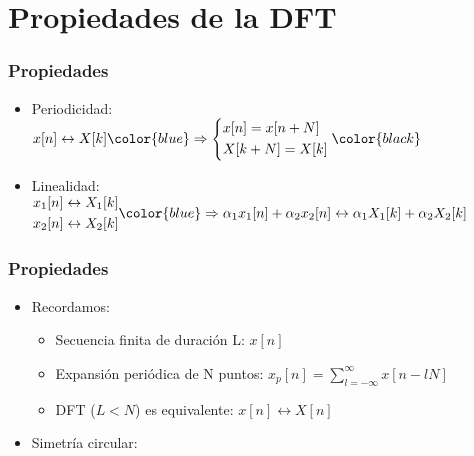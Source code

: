   



\section{Propiedades de la DFT}

\begin{frame}\frametitle{Propiedades}
	\begin{itemize}
		\item \alert{Periodicidad}:\\
		\vspace{0.5cm}
		$x[n]\leftrightarrow X[k] \color{blue}\Rightarrow \left\{\begin{aligned}&x[n]=x[n+N]\\&X[k+N]=X[k]\end{aligned}\right.\color{black}$ 

		\vspace{2cm}
		\item \alert{Linealidad}:\\
		\vspace{0.5cm}
		$\begin{aligned}
			&x_1[n]\leftrightarrow X_1[k] \\
			&x_2[n]\leftrightarrow X_2[k] 
		\end{aligned}\color{blue}\Rightarrow
		\alpha_1 x_1[n] + \alpha_2 x_2[n]\leftrightarrow \alpha_1 X_1[k] + \alpha_2 X_2[k]$ \color{black}
	\end{itemize}
\end{frame}

\begin{frame}\frametitle{Propiedades}
	\begin{itemize}
		\item Recordamos:
		\begin{itemize}
			\item Secuencia finita de duración L: \color{blue}$x[n]$\color{black}
			\item Expansión periódica de N puntos: \color{blue}$x_p[n]=\sum_{l=-\infty}^{\infty} x[n-lN]$\color{black}
			\item DFT ($L<N$) es equivalente: \color{blue}$x[n]\leftrightarrow X[n]$\color{black}
		\end{itemize}
		\item \alert{Simetría circular}:
	\end{itemize}

\end{frame}



